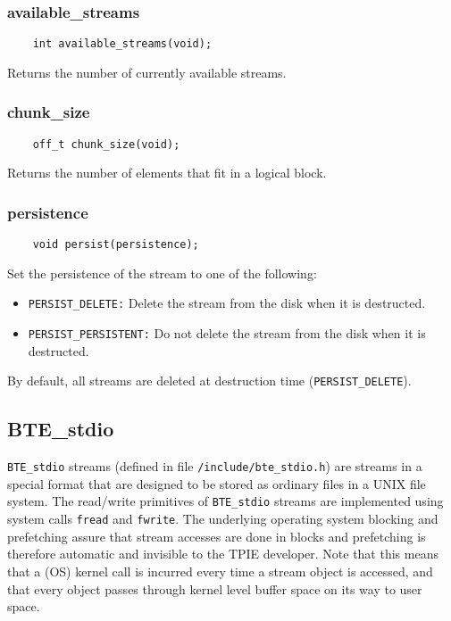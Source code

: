     
\subsubsection{available\_streams}
\begin{verbatim}
    int available_streams(void);    
\end{verbatim}
Returns the number of currently available streams.

\subsubsection{chunk\_size}
\begin{verbatim}
    off_t chunk_size(void);
\end{verbatim}
Returns the number of elements that fit in a logical block.

\subsubsection{persistence}
\begin{verbatim}
    void persist(persistence);
\end{verbatim}
Set the persistence of the stream to one of the following:
\begin{itemize}
\item \verb|PERSIST_DELETE:| Delete the stream from the disk when it is
  destructed.
\item \verb|PERSIST_PERSISTENT:| Do not delete the stream from the disk when
  it is destructed.
\end{itemize}

By default, all streams are deleted at destruction time
(\verb|PERSIST_DELETE|).


\subsection{BTE\_stdio}

\tobeextended

\verb|BTE_stdio| streams (defined in file \verb|/include/bte_stdio.h|) are
streams in a special format that are designed to be stored as ordinary
files in a UNIX file system. The read/write primitives of \verb|BTE_stdio|
streams are implemented using system calls \verb|fread| and
\verb|fwrite|. The underlying operating system blocking and prefetching
assure that stream accesses are done in blocks and prefetching is therefore
automatic and invisible to the TPIE developer. Note that this means that a
(OS) kernel call is incurred every time a stream object is
accessed, and that every object passes through kernel level buffer space on
its way to user space.

